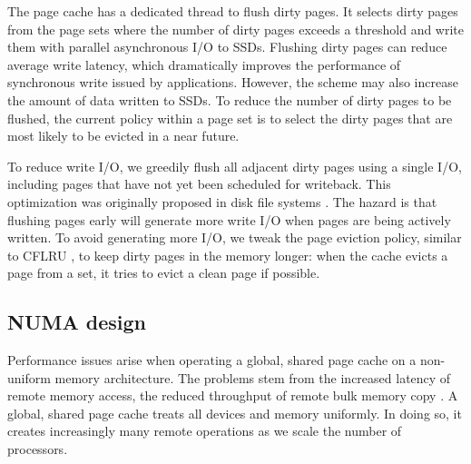 The page cache has a dedicated thread to flush dirty pages. It selects
dirty pages from the page sets where the number of dirty pages exceeds
a threshold and write them with parallel asynchronous I/O to SSDs.
Flushing dirty pages can reduce average write latency, which
dramatically improves the performance of synchronous write
issued by applications. However, the scheme may also increase the amount
of data written to SSDs. To reduce the number of dirty pages to be flushed,
the current policy within a page set is to select the dirty
pages that are most likely to be evicted in a near future.

To reduce write I/O, we greedily flush all adjacent dirty pages 
using a single I/O, including pages that have not yet been scheduled
for writeback.  This optimization was originally proposed in 
disk file systems \cite{awol}.
The hazard is that flushing pages early will 
generate more write I/O when pages are being actively written.
To avoid generating more I/O, 
we tweak the page eviction policy, similar to CFLRU \cite{cflru}, to keep
dirty pages in the memory longer: when the cache evicts
a page from a set, it tries to evict a clean page if possible. 

\subsection{NUMA design}\label{numa_design}

Performance issues arise when operating a global, shared page cache on a 
non-uniform memory architecture.  The problems stem from
the increased latency of remote memory access, the reduced throughput of remote bulk
memory copy \cite{li13}. A global, shared page cache treats all devices and
memory uniformly.  In doing so, it creates increasingly many remote operations as we
scale the number of processors.  

